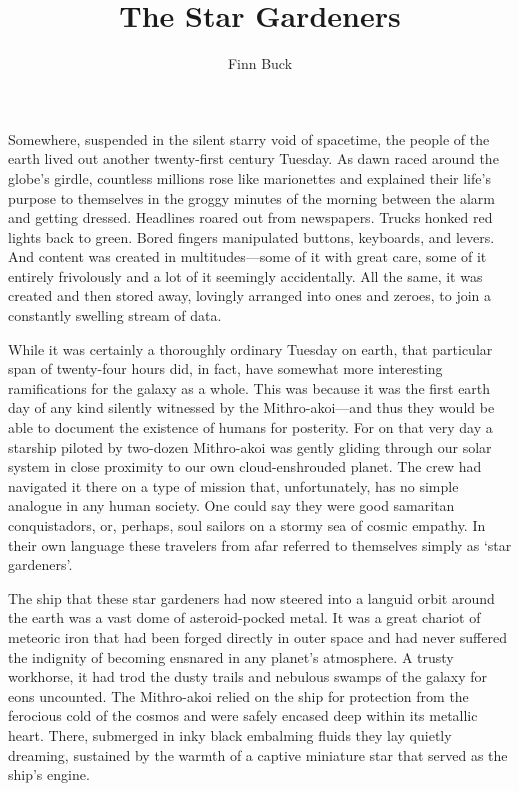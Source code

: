 \documentclass[12pt]{article}
\title{The Star Gardeners}
\author{Finn Buck}
\begin{document}
\maketitle


Somewhere,
suspended in the silent starry void of spacetime,
the people of the earth lived out another twenty-first century Tuesday.
As dawn raced around the globe's girdle,
countless millions rose like marionettes
and explained their life's purpose to themselves in the groggy minutes of the morning between the alarm and getting dressed.
Headlines roared out from newspapers.
Trucks honked red lights back to green.
Bored fingers manipulated buttons, keyboards, and levers.
And content was created in multitudes---some of it with great care,
some of it entirely frivolously
and a lot of it seemingly accidentally.
All the same, it was created and then stored away,
lovingly arranged into ones and zeroes, to join a constantly swelling stream of data.

While it was certainly a thoroughly ordinary Tuesday on earth,
that particular span of twenty-four hours did, in fact, have somewhat more interesting ramifications for the galaxy as a whole.
This was because it was the first earth day of any kind silently witnessed by the Mithro-akoi---and thus they would be able to document the existence of humans for posterity.
For on that very day a starship piloted by two-dozen Mithro-akoi was gently gliding through our solar system in close proximity to our own cloud-enshrouded planet.
The crew had navigated it there on a type of mission that, unfortunately, has no simple analogue in any human society.
One could say they were good samaritan conquistadors,
or, perhaps, soul sailors on a stormy sea of cosmic empathy.
In their own language these travelers from afar referred to themselves simply as `star gardeners'.

The ship that these star gardeners had now steered into a languid orbit around the earth was a vast dome of asteroid-pocked metal.
It was a great chariot of meteoric iron that had been forged directly in outer space 
and had never suffered the indignity of becoming ensnared in any planet's atmosphere.
A trusty workhorse,
it had trod the dusty trails and nebulous swamps of the galaxy for eons uncounted.
The Mithro-akoi relied on the ship for protection from the ferocious cold of the cosmos and were safely encased deep within its metallic heart.
There,
submerged in inky black embalming fluids they lay quietly dreaming,
sustained by the warmth of a captive miniature star that served as the ship's engine.
\end{document}
